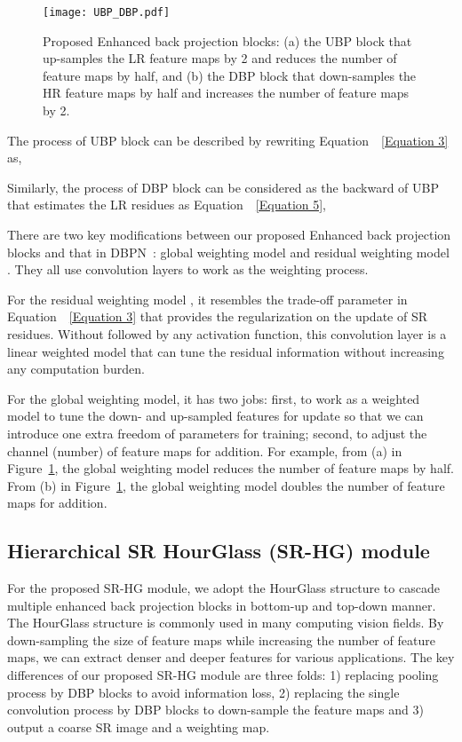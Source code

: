 \documentclass[10pt,twocolumn,letterpaper]{article}
\begin{document}
\begin{figure}[htb]
\vskip 0.01in
\begin{center}
\centerline{\texttt{[image: UBP\_DBP.pdf]}}
\caption{Proposed Enhanced back projection blocks: (a) the UBP block that up-samples the LR feature maps by 2 and reduces the number of feature maps by half, and (b) the DBP block that down-samples the HR feature maps by half and increases the number of feature maps by 2.}
\label{Figure 3}
\end{center}
\vskip -0.3in
\end{figure}

The process of UBP block can be described by rewriting Equation~~\ref{Equation 3} as,
\begin{small}

\end{small}
Similarly, the process of DBP block can be considered as the backward of UBP that estimates the LR residues as Equation~~\ref{Equation 5},
\begin{small}

\end{small}
There are two key modifications between our proposed Enhanced back projection blocks and that in DBPN~\cite{DBPN}: global weighting model  and residual weighting model . They all use  convolution layers to work as the weighting process. 

For the residual weighting model , it resembles the trade-off parameter in Equation~~\ref{Equation 3} that provides the regularization on the update of SR residues. Without followed by any activation function, this  convolution layer is a linear weighted model that can tune the residual information without increasing any computation burden.

For the global weighting model, it has two jobs: first, to work as a weighted model to tune the down- and up-sampled features for update so that we can introduce one extra freedom of parameters for training; second, to adjust the channel (number) of feature maps for addition. For example, from (a) in Figure~\ref{Figure 3}, the global weighting model reduces the number of feature maps by half. From (b) in Figure~\ref{Figure 3}, the global weighting model doubles the number of feature maps for addition. 

\subsection{Hierarchical SR HourGlass (SR-HG) module}
For the proposed SR-HG module, we adopt the HourGlass structure to cascade multiple enhanced back projection blocks in bottom-up and top-down manner. The HourGlass structure is commonly used in many computing vision fields. By down-sampling the size of feature maps while increasing the number of feature maps, we can extract denser and deeper features for various applications. The key differences of our proposed SR-HG module are three folds: 1) replacing pooling process by DBP blocks to avoid information loss, 2) replacing the single convolution process by DBP blocks to down-sample the feature maps and 3) output a coarse SR image and a weighting map.
\end{document}
